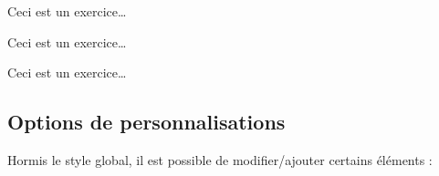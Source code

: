 \documentclass[french,11pt,a4paper]{article}
\begin{document}
\begin{DemoCode}{}
\begin{EnvtExo}
Ceci est un exercice\ldots
\end{EnvtExo}

\begin{EnvtExoAlt}
Ceci est un exercice\ldots
\end{EnvtExoAlt}
\end{DemoCode}

\begin{DemoCode}{}
\TitreExo

Ceci est un exercice\ldots
\end{DemoCode}

\subsection{Options de personnalisations}

Hormis le style global, il est possible de modifier/ajouter certains éléments :
\end{document}
